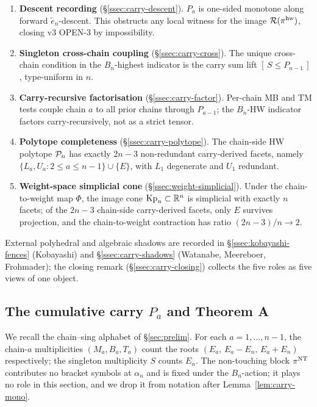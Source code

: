 \begin{enumerate}[label=(R\arabic*),leftmargin=2.5em]
  \item \textbf{Descent recording} (\S\ref{ssec:carry-descent}). $P_a$ is one-sided
    monotone along forward $\widetilde{e}_n$-descent. This obstructs any local
    witness for the image $\mathcal{R}(\pi^{\mathrm{hw}})$, closing v3 OPEN-3 by impossibility.
  \item \textbf{Singleton cross-chain coupling} (\S\ref{ssec:carry-cross}). The
    unique cross-chain condition in the $B_n$-highest indicator is the carry
    sum lift $[\,S \le P_{n-1}\,]$, type-uniform in $n$.
  \item \textbf{Carry-recursive factorisation} (\S\ref{ssec:carry-factor}). Per-chain
    MB and TM tests couple chain $a$ to all prior chains through $P_{a-1}$;
    the $B_n$-HW indicator factors carry-recursively, not as a strict tensor.
  \item \textbf{Polytope completeness} (\S\ref{ssec:carry-polytope}). The chain-side
    HW polytope $\mathcal{P}_n$ has exactly $2n - 3$ non-redundant carry-derived facets,
    namely $\{L_a, U_a : 2 \le a \le n-1\} \cup \{E\}$, with $L_1$ degenerate
    and $U_1$ redundant.
  \item \textbf{Weight-space simplicial cone} (\S\ref{ssec:weight-simplicial}).
    Under the chain-to-weight map $\Phi$, the image cone $\mathrm{Kp}_n \subset
    \mathbb{R}^n$ is simplicial with exactly $n$ facets; of the $2n - 3$
    chain-side carry-derived facets, only $E$ survives projection, and the
    chain-to-weight contraction has ratio $(2n - 3)/n \to 2$.
\end{enumerate}

External polyhedral and algebraic shadows are recorded in
\S\ref{ssec:kobayashi-fences} (Kobayashi) and \S\ref{ssec:carry-shadows}
(Watanabe, Meereboer, Frohmader); the closing remark (\S\ref{ssec:carry-closing})
collects the five roles as five views of one object.

\subsection{The cumulative carry $P_a$ and Theorem A}\label{ssec:carry-Pa}

We recall the chain--sing alphabet of \S\ref{sec:prelim}. For each
$a = 1, \dots, n-1$, the chain-$a$ multiplicities $(M_a, B_a, T_a)$ count the
roots $(E_a,\, E_a - E_n,\, E_a + E_n)$ respectively; the singleton multiplicity
$S$ counts $E_n$. The non-touching block $\pi^{\mathrm{NT}}$ contributes no bracket symbols
at $\alpha_n$ and is fixed under the $B_n$-action; it plays no role in this
section, and we drop it from notation after Lemma~\ref{lem:carry-mono}.

